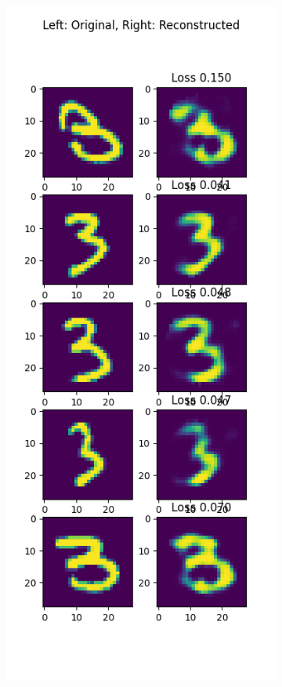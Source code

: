 \begin{solve}
\begin{figure}[H]
\begin{subfigure}{.5\textwidth}
  \end{subfigure}%
  \begin{subfigure}{.5\textwidth}
    \centering
    \includegraphics[width=.9\linewidth]{plots/output_3.png}
  \end{subfigure}
  \end{figure}


\end{solve}
